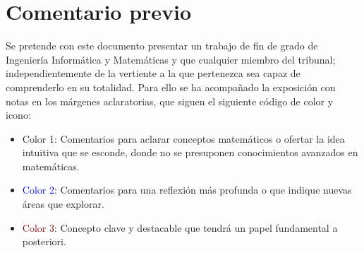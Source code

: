 
\section*{Comentario previo}

Se pretende con este documento presentar un  trabajo de fin de grado de Ingeniería Informática y Matemáticas y que cualquier miembro del tribunal; 
independientemente de la vertiente a la que pertenezca sea capaz de comprenderlo en su totalidad.  
Para ello se ha acompañado la exposición con notas en los márgenes aclaratorias, que siguen el siguiente código de color y icono: 

\begin{itemize}
    \item \textcolor{dark_green}{Color 1}: Comentarios para aclarar conceptos matemáticos o ofertar la idea intuitiva que se esconde, donde no se presuponen conocimientos avanzados en matemáticas. 
    \item \textcolor{blue}{Color 2}: Comentarios para una reflexión más profunda o que indique nuevas áreas que explorar. 
    \item \textcolor{darkRed}{Color 3}: Concepto clave y destacable que tendrá un papel fundamental a posteriori.  
\end{itemize}


